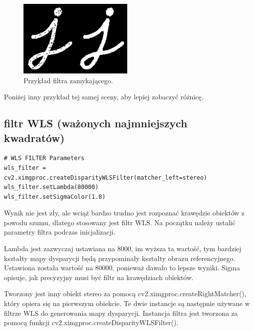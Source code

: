 \documentclass[magisterska]{pracadypl}
\begin{document}
\begin{figure}[H]  %
    \centering  %
    \includegraphics[width=0.5\textwidth]{images/closing.png}  %
    \captionsetup{font=footnotesize}
    \caption[Przykład filtra zamykającego. https://docs.opencv.org/3.4/d9/d61/tutorial-py-morphological-ops.html]{Przykład filtra zamykającego.}
\end{figure}

Poniżej inny przykład tej samej sceny, aby lepiej zobaczyć różnicę.

\subsection{filtr WLS (ważonych najmniejszych kwadratów)}

\begin{lstlisting}[style=mypython]
# WLS FILTER Parameters
wls_filter = cv2.ximgproc.createDisparityWLSFilter(matcher_left=stereo)
wls_filter.setLambda(80000)
wls_filter.setSigmaColor(1.8)
\end{lstlisting}

Wynik nie jest zły, ale wciąż bardzo trudno jest rozpoznać krawędzie obiektów z powodu szumu, dlatego stosowany jest filtr WLS. Na początku należy ustalić parametry filtra podczas inicjalizacji.

Lambda jest zazwyczaj ustawiana na 8000, im wyższa ta wartość, tym bardziej kształty mapy dysparycji będą przypominały kształty obrazu referencyjnego. Ustawiona została wartość na 80000, ponieważ dawało to lepsze wyniki. Sigma opisuje, jak precyzyjny musi być filtr na krawędziach obiektów.

Tworzony jest inny obiekt stereo za pomocą cv2.ximgproc.createRightMatcher(), który opiera się na pierwszym obiekcie. Te dwie instancje są następnie używane w filtrze WLS do generowania mapy dysparycji. Instancja filtra jest tworzona za pomocą funkcji cv2.ximgproc.createDisparityWLSFilter().
\end{document}
